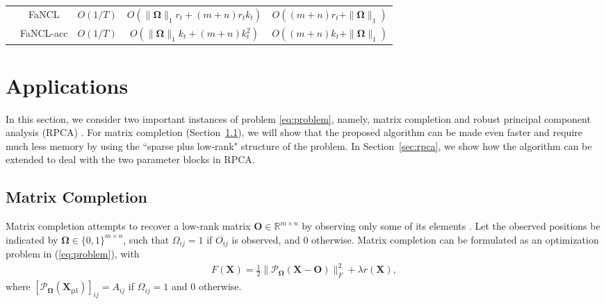 \documentclass[10pt,journal,compsoc]{IEEEtran}
\def \R{\mathbb R}
\newcommand{\X}{\mathbf{X}}
\newcommand{\NM}[2]{\| #1 \|_{#2} }
\newcommand{\SO}[1]{\mathcal{P}_{\mathbf{\Omega}}(#1)}
\begin{document}
\begin{table*}[ht]
\begin{tabular}{c | c | c | c | c}
	                         & \textsf{FaNCL}                                           & $O(1/T)$           & $O\left(  \NM{\mathbf{\Omega}}{1} r_t + (m + n)r_t k_t \right)$ & $O((m + n)r_t + \NM{\mathbf{\Omega}}{1})$ \\ \cline{2-5}
	                         & \textsf{FaNCL-acc}                                       & $O(1/T)$           & $O\left(  \NM{\mathbf{\Omega}}{1} k_t + (m + n)k_t^2 \right)$   & $O((m + n)k_t + \NM{\mathbf{\Omega}}{1})$ \\ \hline
\end{tabular}
\label{tab:timecomp}
\end{table*}




\section{Applications}
\label{sec:applications}

In this section,
we consider two important instances of problem \eqref{eq:problem},
namely, matrix completion \cite{candes2009exact}
and robust principal component analysis (RPCA) \cite{candes2011robust}.
For
matrix completion (Section~\ref{sec:matcomp}),
we will show that the proposed algorithm
can be made even faster and require much less
memory by using the ``sparse plus low-rank" structure of the problem.
In Section~\ref{sec:rpca},
we show how the 
algorithm
can be extended to deal with 
the two parameter blocks
in RPCA.





\subsection{Matrix Completion}
\label{sec:matcomp}

Matrix completion attempts to recover a low-rank matrix $\mathbf{O} \in \R^{m \times
n}$ by observing only some of its elements \cite{candes2009exact}.  
Let the 
observed positions be indicated by  
$\mathbf{\Omega} \in \{0,1\}^{m \times n}$, such that
$\Omega_{ij}=1$ if $O_{ij}$ is observed, and 0 otherwise.
Matrix completion can be formulated as an optimization
problem in (\ref{eq:problem}), with
\begin{align}
F(\X) = \frac{1}{2}\NM{\SO{\X - \mathbf{O}}}{F}^2 + \lambda r(\X),
\label{eq:matcomp}
\end{align}
where $[\SO{\X_{\text{gd}}}]_{ij} = A_{ij}$ if  $\Omega_{ij} = 1$ and $0$ otherwise.
\end{document}
